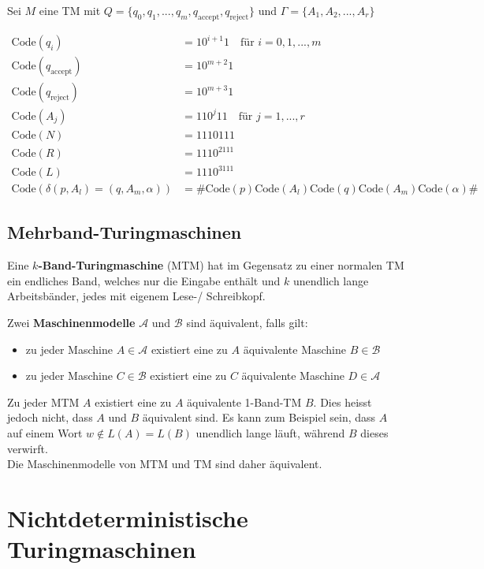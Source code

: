 \documentclass[11pt]{article}
\newcommand{\code}{\text{Code}}
\begin{document}
Sei $M$ eine TM mit $Q = \{q_0, q_1, ..., q_m, q_\text{accept}, q_\text{reject}\}$ und $\Gamma = \{A_1, A_2,...,A_r\}$

\begin{equation*}
\begin{split}
	\code(q_i) & = 10^{i+1}1 \quad\text{f{\"u}r } i = 0,1,...,m \\
	\code(q_\text{accept}) & = 10^{m+2}1 \\
	\code(q_\text{reject}) & = 10^{m+3}1 \\
	\code(A_j) & = 110^j11 \quad\text{f{\"u}r } j = 1,...,r \\
	\code(N) & = 1110111 \\
	\code(R) & = 1110^2111 \\
	\code(L) & = 1110^3111 \\
	\code(\delta(p, A_l) = (q, A_m, \alpha)) & = \#\code(p)\code(A_l)\code(q)\code(A_m)\code(\alpha)\#
\end{split}
\end{equation*}

\subsection{Mehrband-Turingmaschinen}

Eine \textbf{$k$-Band-Turingmaschine} (MTM) hat im Gegensatz zu einer normalen TM ein endliches Band, welches nur die Eingabe enth{\"a}lt und $k$ unendlich lange Arbeitsb{\"a}nder, jedes mit eigenem Lese-/ Schreibkopf.

Zwei \textbf{Maschinenmodelle} $\mathcal{A}$ und $\mathcal{B}$ sind {\"a}quivalent, falls gilt:
\begin{itemize}[noitemsep]
	\item zu jeder Maschine $A \in \mathcal{A}$ existiert eine zu $A$ {\"a}quivalente Maschine $B \in \mathcal{B}$
	\item zu jeder Maschine $C \in \mathcal{B}$ existiert eine zu $C$ {\"a}quivalente Maschine $D \in \mathcal{A}$
\end{itemize}

Zu jeder MTM $A$ existiert eine zu $A$ {\"a}quivalente 1-Band-TM $B$. Dies heisst jedoch nicht, dass $A$ und $B$ {\"a}quivalent sind. Es kann zum Beispiel sein, dass $A$ auf einem Wort $w \not\in L(A) = L(B)$ unendlich lange l{\"a}uft, w{\"a}hrend $B$ dieses verwirft. \\
Die Maschinenmodelle von MTM und TM sind daher {\"a}quivalent.

\section{Nichtdeterministische Turingmaschinen}
\end{document}
